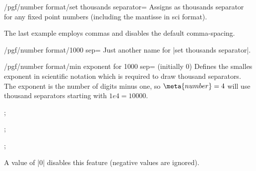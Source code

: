 \begin{key}{/pgf/number format/set thousands separator=}
Assigns  as thousands separator for any fixed point numbers (including the mantisse in sci format).

\begin{codeexample}[]
\end{codeexample}
\begin{codeexample}[]
\end{codeexample}

\begin{codeexample}[]
\end{codeexample}
\begin{codeexample}[]
\end{codeexample}
\begin{codeexample}[]
\end{codeexample}
The last example employs commas and disables the default comma-spacing. 
\end{key}
\begin{key}{/pgf/number format/1000 sep=}
	Just another name for |set thousands separator|.
\end{key}

\begin{key}{/pgf/number format/min exponent for 1000 sep= (initially 0)}
	Defines the smalles exponent in scientific notation which is required to draw thousand separators. The exponent is the number of digits minus one, so $\meta{number}=4$ will use thousand separators starting with $1e4 = 10000$.
\begin{codeexample}[]
; 
\end{codeexample}

\begin{codeexample}[]
; 
\end{codeexample}
\begin{codeexample}[]
; 
\end{codeexample}
\noindent A value of |0| disables this feature (negative values are ignored).
\end{key}



